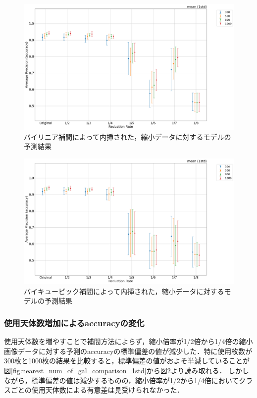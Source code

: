 \documentclass[a4j, 11pt]{jreport}
\begin{document}
\begin{figure}[H]
  \centering
  \includegraphics[width=1.0\hsize, keepaspectratio]{images/5syou/print_errorbar/linear/acc_with_errorbar_syuron5_linear_900epoch_30run_num_of_gal_comparison_acc_max_std1sigma.png}
  \caption{バイリニア補間によって内挿された，縮小データに対するモデルの予測結果}
  \label{fig:linear_num_of_gal_comparison_1std}
\end{figure}

\begin{figure}[H]
  \centering
  \includegraphics[width=1.0\hsize, keepaspectratio]{images/5syou/print_errorbar/cubic/acc_with_errorbar_syuron5_cubic_900epoch_30run_num_of_gal_comparison_acc_max_std1sigma.png}
  \caption{バイキュービック補間によって内挿された，縮小データに対するモデルの予測結果}
  \label{fig:cubic_num_of_gal_comparison_1std}
\end{figure}

\subsubsection{使用天体数増加によるaccuracyの変化}
使用天体数を増やすことで補間方法によらず，縮小倍率が1/2倍から1/4倍の縮小画像データに対する予測のaccuracyの標準偏差の値が減少した．特に使用枚数が300枚と1000枚の結果を比較すると，標準偏差の値がおよそ半減していることが図\ref{fig:nearest_num_of_gal_comparison_1std}から図\ref{fig:cubic_num_of_gal_comparison_1std}より読み取れる．
しかしながら，標準偏差の値は減少するものの，縮小倍率が1/2から1/4倍においてクラスごとの使用天体数による有意差は見受けられなかった．
\end{document}
